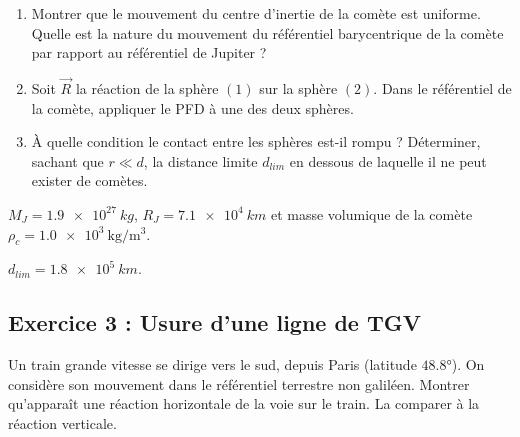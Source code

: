\begin{enumerate}
	\item Montrer que le mouvement du centre d'inertie de la comète est uniforme. Quelle est la nature du mouvement du référentiel barycentrique de la comète par rapport au référentiel de Jupiter ?
	\item Soit $\vec{R}$ la réaction de la sphère $(1)$ sur la sphère $(2)$. Dans le référentiel de la comète, appliquer le PFD à une des deux sphères.
	\item À quelle condition le contact entre les sphères est-il rompu ? Déterminer, sachant que $r \ll d$, la distance limite $d_{lim}$ en dessous de laquelle il ne peut exister de comètes.
\end{enumerate}

 $M_J = \SI{1.9e27}{kg}$, $R_J = \SI{7.1e4}{km}$ et masse volumique de la comète $\rho_c = \SI{1.0e3}{\kilogram\per\cubic\metre}$.

 $d_{lim} = \SI{1.8e5}{km}$.

\subsection{Exercice 3 : Usure d'une ligne de TGV}

Un train grande vitesse se dirige vers le sud, depuis Paris (latitude $48.8$°). On considère son mouvement dans le référentiel terrestre non galiléen. Montrer qu'apparaît une réaction horizontale de la voie sur le train. La comparer à la réaction verticale. 



